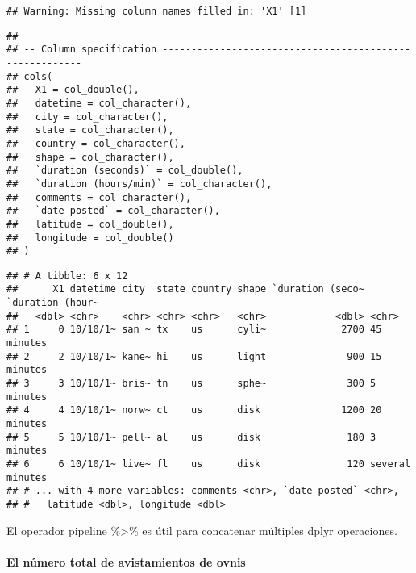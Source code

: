 \documentclass[]{article}
\newenvironment{Shaded}{\begin{snugshade}}{\end{snugshade}}
\newcommand{\KeywordTok}[1]{\textcolor[rgb]{0.13,0.29,0.53}{\textbf{#1}}}
\newcommand{\StringTok}[1]{\textcolor[rgb]{0.31,0.60,0.02}{#1}}
\newcommand{\OperatorTok}[1]{\textcolor[rgb]{0.81,0.36,0.00}{\textbf{#1}}}
\newcommand{\NormalTok}[1]{#1}
\let\oldparagraph\paragraph
\renewcommand{\paragraph}[1]{\oldparagraph{#1}\mbox{}}
\begin{document}
\begin{verbatim}
## Warning: Missing column names filled in: 'X1' [1]
\end{verbatim}

\begin{verbatim}
## 
## -- Column specification --------------------------------------------------------
## cols(
##   X1 = col_double(),
##   datetime = col_character(),
##   city = col_character(),
##   state = col_character(),
##   country = col_character(),
##   shape = col_character(),
##   `duration (seconds)` = col_double(),
##   `duration (hours/min)` = col_character(),
##   comments = col_character(),
##   `date posted` = col_character(),
##   latitude = col_double(),
##   longitude = col_double()
## )
\end{verbatim}

\begin{Shaded}
\end{Shaded}

\begin{verbatim}
## # A tibble: 6 x 12
##      X1 datetime city  state country shape `duration (seco~ `duration (hour~
##   <dbl> <chr>    <chr> <chr> <chr>   <chr>            <dbl> <chr>           
## 1     0 10/10/1~ san ~ tx    us      cyli~             2700 45 minutes      
## 2     2 10/10/1~ kane~ hi    us      light              900 15 minutes      
## 3     3 10/10/1~ bris~ tn    us      sphe~              300 5 minutes       
## 4     4 10/10/1~ norw~ ct    us      disk              1200 20 minutes      
## 5     5 10/10/1~ pell~ al    us      disk               180 3  minutes      
## 6     6 10/10/1~ live~ fl    us      disk               120 several minutes 
## # ... with 4 more variables: comments <chr>, `date posted` <chr>,
## #   latitude <dbl>, longitude <dbl>
\end{verbatim}

El operador pipeline \%\textgreater{}\% es útil para concatenar
múltiples dplyr operaciones.

\paragraph{El número total de avistamientos de
ovnis}\label{el-nuxfamero-total-de-avistamientos-de-ovnis}

\begin{Shaded}
\end{Shaded}
\end{document}
